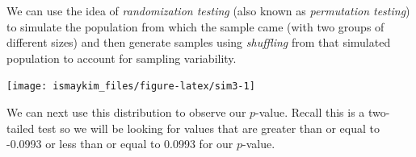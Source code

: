 \documentclass[]{tufte-book}
\newenvironment{Shaded}{\begin{snugshade}}{\end{snugshade}}
\newcommand{\KeywordTok}[1]{\textcolor[rgb]{0.13,0.29,0.53}{\textbf{{#1}}}}
\newcommand{\DataTypeTok}[1]{\textcolor[rgb]{0.13,0.29,0.53}{{#1}}}
\newcommand{\DecValTok}[1]{\textcolor[rgb]{0.00,0.00,0.81}{{#1}}}
\newcommand{\StringTok}[1]{\textcolor[rgb]{0.31,0.60,0.02}{{#1}}}
\newcommand{\NormalTok}[1]{{#1}}
\theoremstyle{definition}
\theoremstyle{definition}
\theoremstyle{remark}
\begin{document}
We can use the idea of \emph{randomization testing} (also known as
\emph{permutation testing}) to simulate the population from which the
sample came (with two groups of different sizes) and then generate
samples using \emph{shuffling} from that simulated population to account
for sampling variability.

\begin{Shaded}
\end{Shaded}

\begin{center}\texttt{[image: ismaykim\_files/figure-latex/sim3-1]} \end{center}

We can next use this distribution to observe our \(p\)-value. Recall
this is a two-tailed test so we will be looking for values that are
greater than or equal to -0.0993 or less than or equal to 0.0993 for our
\(p\)-value.

\begin{Shaded}
\end{Shaded}
\end{document}

